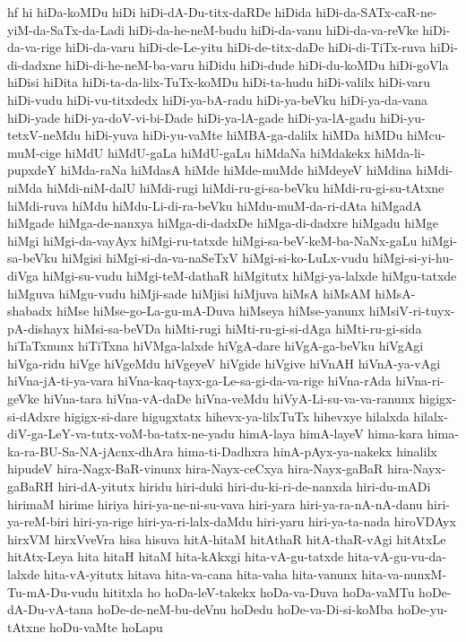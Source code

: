 {hf
hi
hiDa-koMDu
hiDi
hiDi-dA-Du-titx-daRDe
hiDida
hiDi-da-SATx-caR-ne-yiM-da-SaTx-da-Ladi
hiDi-da-he-neM-budu
hiDi-da-vanu
hiDi-da-va-reVke
hiDi-da-va-rige
hiDi-da-varu
hiDi-de-Le-yitu
hiDi-de-titx-daDe
hiDi-di-TiTx-ruva
hiDi-di-dadxne
hiDi-di-he-neM-ba-varu
hiDidu
hiDi-dude
hiDi-du-koMDu
hiDi-goVla
hiDisi
hiDita
hiDi-ta-da-lilx-TuTx-koMDu
hiDi-ta-hudu
hiDi-valilx
hiDi-varu
hiDi-vudu
hiDi-vu-titxdedx
hiDi-ya-bA-radu
hiDi-ya-beVku
hiDi-ya-da-vana
hiDi-yade
hiDi-ya-doV-vi-bi-Dade
hiDi-ya-lA-gade
hiDi-ya-lA-gadu
hiDi-yu-tetxV-neMdu
hiDi-yuva
hiDi-yu-vaMte
hiMBA-ga-dalilx
hiMDa
hiMDu
hiMcu-muM-cige
hiMdU
hiMdU-gaLa
hiMdU-gaLu
hiMdaNa
hiMdakekx
hiMda-li-pupxdeY
hiMda-raNa
hiMdasA
hiMde
hiMde-muMde
hiMdeyeV
hiMdina
hiMdi-niMda
hiMdi-niM-dalU
hiMdi-rugi
hiMdi-ru-gi-sa-beVku
hiMdi-ru-gi-su-tAtxne
hiMdi-ruva
hiMdu
hiMdu-Li-di-ra-beVku
hiMdu-muM-da-ri-dAta
hiMgadA
hiMgade
hiMga-de-nanxya
hiMga-di-dadxDe
hiMga-di-dadxre
hiMgadu
hiMge
hiMgi
hiMgi-da-vayAyx
hiMgi-ru-tatxde
hiMgi-sa-beV-keM-ba-NaNx-gaLu
hiMgi-sa-beVku
hiMgisi
hiMgi-si-da-va-naSeTxV
hiMgi-si-ko-LuLx-vudu
hiMgi-si-yi-hu-diVga
hiMgi-su-vudu
hiMgi-teM-dathaR
hiMgitutx
hiMgi-ya-lalxde
hiMgu-tatxde
hiMguva
hiMgu-vudu
hiMji-sade
hiMjisi
hiMjuva
hiMsA
hiMsAM
hiMsA-shabadx
hiMse
hiMse-go-La-gu-mA-Duva
hiMseya
hiMse-yanunx
hiMsiV-ri-tuyx-pA-dishayx
hiMsi-sa-beVDa
hiMti-rugi
hiMti-ru-gi-si-dAga
hiMti-ru-gi-sida
hiTaTxnunx
hiTiTxna
hiVMga-lalxde
hiVgA-dare
hiVgA-ga-beVku
hiVgAgi
hiVga-ridu
hiVge
hiVgeMdu
hiVgeyeV
hiVgide
hiVgive
hiVnAH
hiVnA-ya-vAgi
hiVna-jA-ti-ya-vara
hiVna-kaq-tayx-ga-Le-sa-gi-da-va-rige
hiVna-rAda
hiVna-ri-geVke
hiVna-tara
hiVna-vA-daDe
hiVna-veMdu
hiVyA-Li-su-va-va-ranunx
higigx-si-dAdxre
higigx-si-dare
higugxtatx
hihevx-ya-lilxTuTx
hihevxye
hilalxda
hilalx-diV-ga-LeY-va-tutx-voM-ba-tatx-ne-yadu
himA-laya
himA-layeV
hima-kara
hima-ka-ra-BU-Sa-NA-jAcnx-dhAra
hima-ti-Dadhxra
hinA-pAyx-ya-nakekx
hinalilx
hipudeV
hira-Nagx-BaR-vinunx
hira-Nayx-ceCxya
hira-Nayx-gaBaR
hira-Nayx-gaBaRH
hiri-dA-yitutx
hiridu
hiri-duki
hiri-du-ki-ri-de-nanxda
hiri-du-mADi
hirimaM
hirime
hiriya
hiri-ya-ne-ni-su-vava
hiri-yara
hiri-ya-ra-nA-nA-danu
hiri-ya-reM-biri
hiri-ya-rige
hiri-ya-ri-lalx-daMdu
hiri-yaru
hiri-ya-ta-nada
hiroVDAyx
hirxVM
hirxVveVra
hisa
hisuva
hitA-hitaM
hitAthaR
hitA-thaR-vAgi
hitAtxLe
hitAtx-Leya
hita
hitaH
hitaM
hita-kAkxgi
hita-vA-gu-tatxde
hita-vA-gu-vu-da-lalxde
hita-vA-yitutx
hitava
hita-va-cana
hita-vaha
hita-vanunx
hita-va-nunxM-Tu-mA-Du-vudu
hititxla
ho
hoDa-leV-takekx
hoDa-va-Duva
hoDa-vaMTu
hoDe-dA-Du-vA-tana
hoDe-de-neM-bu-deVnu
hoDedu
hoDe-va-Di-si-koMba
hoDe-yu-tAtxne
hoDu-vaMte
hoLapu
}
